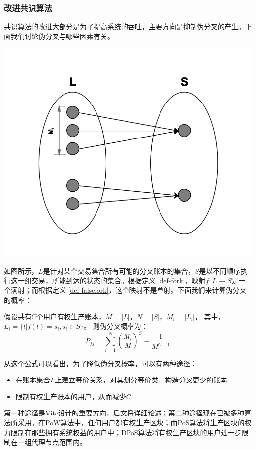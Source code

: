 \documentclass[UTF8,nofonts]{ctexart}
\begin{document}
\begin{multicols}{2}
\subsubsection{改进共识算法}
共识算法的改进大部分是为了提高系统的吞吐，主要方向是抑制伪分叉的产生。下面我们讨论伪分叉与哪些因素有关。

\includegraphics[width=.8\linewidth]{image/falsefork.png}

如图所示，$L$是针对某个交易集合所有可能的分叉账本的集合，$S$是以不同顺序执行这一组交易，所能到达的状态的集合。根据定义 \ref{def-fork}，映射$f: L \rightarrow S$是一个满射；而根据定义 \ref{def-falsefork}，这个映射不是单射。下面我们来计算伪分叉的概率：

假设共有$C$个用户有权生产账本，$M = \vert L \vert$，$N = \vert S \vert$，$M_{i} = \vert L_{i} \vert$， 其中，$L_{i} = \lbrace l \vert f(l) = s_{i}, s_{i} \in S \rbrace$。
则伪分叉概率为：
\begin{equation}
P_{ff} = \sum_{i=1}^{N}\left ( \frac{M_{i}}{M} \right )^{C} - \frac{1}{M^{C-1}}
\end{equation}

从这个公式可以看出，为了降低伪分叉概率，可以有两种途径：
\begin{itemize}
	\item 在账本集合$L$上建立等价关系，对其划分等价类，构造分叉更少的账本
	\item 限制有权生产账本的用户，从而减少$C$
\end{itemize}

第一种途径是Vite设计的重要方向，后文将详细论述；第二种途径现在已被多种算法所采用。在PoW算法中，任何用户都有权生产区块；而PoS算法将生产区块的权力限制在那些拥有系统权益的用户中；DPoS算法\cite{dpos}将有权生产区块的用户进一步限制在一组代理节点范围内。
	

\end{multicols}
\end{document}
